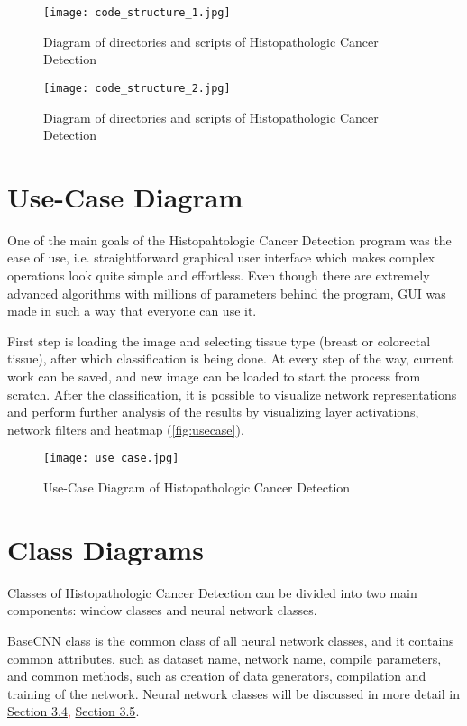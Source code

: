 \begin{figure}[h]
	\centering
	\texttt{[image: code\_structure\_1.jpg]}
	\caption{Diagram of directories and scripts of Histopathologic Cancer Detection}
	\label{fig:dirdiag}
\end{figure}

\clearpage

\begin{figure}[h]
	\centering
	\texttt{[image: code\_structure\_2.jpg]}
	\caption{Diagram of directories and scripts of Histopathologic Cancer Detection}
	\label{fig:dirdiag2}
\end{figure}

\section{Use-Case Diagram}

One of the main goals of the Histopahtologic Cancer Detection program was the ease of use, i.e. straightforward graphical user interface which makes complex operations look quite simple and effortless. Even though there are extremely advanced algorithms with millions of parameters behind the program, GUI was made in such a way that everyone can use it. 

First step is loading the image and selecting tissue type (breast or colorectal tissue), after which classification is being done. At every step of the way, current work can be saved, and new image can be loaded to start the process from scratch. After the classification, it is possible to visualize network representations and perform further analysis of the results by visualizing layer activations, network filters and heatmap (\textcolor{red}{\autoref{fig:usecase}}).

\begin{figure}[h]
	\centering
	\texttt{[image: use\_case.jpg]}
	\caption{Use-Case Diagram of Histopathologic Cancer Detection}
	\label{fig:usecase}
\end{figure}

\section{Class Diagrams}

Classes of Histopathologic Cancer Detection can be divided into two main components: window classes and neural network classes.

BaseCNN class is the common class of all neural network classes, and it contains common attributes, such as dataset name, network name, compile parameters, and common methods, such as creation of data generators, compilation and training of the network. Neural network classes will be discussed in more detail in \textcolor{red}{\hyperref[cnn]{Section 3.4}, \hyperref[vgg19]{Section 3.5}}.

